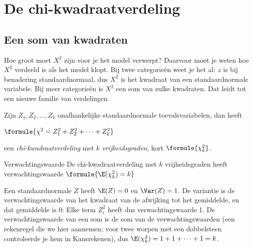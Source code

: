 \begin{oefeningen}
\end{oefeningen}

\section{De chi-kwadraatverdeling}

\subsection{Een som van kwadraten}

Hoe groot moet $X^2$ zijn voor je het model verwerpt? Daarvoor moet je weten hoe $X^2$ verdeeld is als het model klopt. Bij twee categorieën weet je het al: $z$ is bij benadering standaardnormaal, dus $X^2$ is het kwadraat van een standaardnormale variabele. Bij meer categorieën is $X^2$ een som van zulke kwadraten. Dat leidt tot een nieuwe familie van verdelingen.

\begin{theorie}
Zijn $Z_1, Z_2, \ldots, Z_k$ onafhankelijke standaardnormale toevalsvariabelen, dan heeft

\vspace{1mm}
\qquad $\formule{\chi^2 = Z_1^2 + Z_2^2 + \cdots + Z_k^2}$

\vspace{1mm}
een \emph{chi-kwadraatverdeling} met $k$ \emph{vrijheidsgraden}, kort $\formule{\chi^2_k}$.

\begin{stelling}{Verwachtingswaarde}
De chi-kwadraatverdeling met $k$ vrijheidsgraden heeft verwachtingswaarde \quad $\formule{\E(\chi^2_k) = k}$
\end{stelling}

\begin{bewijs}
Een standaardnormale $Z$ heeft $\E(Z) = 0$ en $\Var(Z) = 1$. De variantie is de verwachtingswaarde van het kwadraat van de afwijking tot het gemiddelde, en dat gemiddelde is 0:
Elke term $Z_i^2$ heeft dus verwachtingswaarde 1. De verwachtingswaarde van een som is de som van de verwachtingswaarden (een rekenregel die we hier aannemen; voor twee worpen met een dobbelsteen controleerde je hem in Kansrekenen), dus $\E(\chi^2_k) = 1 + 1 + \cdots + 1 = k$.
\end{bewijs}
\end{theorie}

